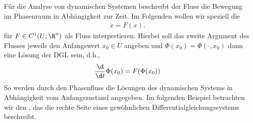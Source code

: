 \documentclass[letterpaper,10pt,english]{jupyterBook}
\begin{document}
\sphinxAtStartPar
Für die Analyse von dynamischen Systemen beschreibt der Fluss die Bewegung im Phasenraum in Abhängigkeit zur Zeit.
Im Folgenden wollen wir speziell die 
\begin{equation*}
\begin{split}\dot{x} = F(x).\end{split}
\end{equation*}
\sphinxAtStartPar
für \(F\in C^1(U;\R^n)\) als Fluss interpretieren.
Hierbei soll das zweite Argument des Flusses jeweils den Anfangswert \(x_0\in U\) angeben und \(\Phi(x_0) = \Phi(\cdot, x_0)\) dann eine Lösung der DGL sein, d.h.,
\begin{equation*}
\begin{split}\frac{\d}{\d t} \Phi(x_0) = F(\Phi(x_0))\end{split}
\end{equation*}
\sphinxAtStartPar
So werden durch den Phasenfluss die Lösungen des dynamischen Systems in Abhängigkeit vom Anfangszustand angegeben.
Im folgenden Beispiel betrachten wir den , das die rechte Seite eines gewöhnlichen Differentialgleichungssystems beschreibt.
\label{ode/fluesse:example-1}
\end{document}

